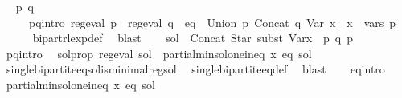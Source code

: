 \begin{isabellebody}
\ \isamarkupfalse%
\ p\ q\isanewline
\ \ \ \ \ p{\isacharunderscore}{\kern0pt}q{\isacharunderscore}{\kern0pt}intro{\isacharcolon}{\kern0pt}\ {\isachardoublequoteopen}reg{\isacharunderscore}{\kern0pt}eval\ p\ {\isasymand}\ reg{\isacharunderscore}{\kern0pt}eval\ q\ {\isasymand}\ eq{\isacharprime}{\kern0pt}\ {\isacharequal}{\kern0pt}\ Union\ p\ {\isacharparenleft}{\kern0pt}Concat\ q\ {\isacharparenleft}{\kern0pt}Var\ x{\isacharparenright}{\kern0pt}{\isacharparenright}{\kern0pt}\ {\isasymand}\ x\ {\isasymnotin}\ vars\ p{\isachardoublequoteclose}\isanewline
\ \ \ \ \isamarkupfalse%
\ bipart{\isacharunderscore}{\kern0pt}rlexp{\isacharunderscore}{\kern0pt}def\ \isamarkupfalse%
\ blast\isanewline
\ \ \isamarkupfalse%
\ {\isacharquery}{\kern0pt}sol\ {\isacharequal}{\kern0pt}\ {\isachardoublequoteopen}Concat\ {\isacharparenleft}{\kern0pt}Star\ {\isacharparenleft}{\kern0pt}subst\ {\isacharparenleft}{\kern0pt}Var{\isacharparenleft}{\kern0pt}x\ {\isacharcolon}{\kern0pt}{\isacharequal}{\kern0pt}\ p{\isacharparenright}{\kern0pt}{\isacharparenright}{\kern0pt}\ q{\isacharparenright}{\kern0pt}{\isacharparenright}{\kern0pt}\ p{\isachardoublequoteclose}\isanewline
\ \ \isamarkupfalse%
\ p{\isacharunderscore}{\kern0pt}q{\isacharunderscore}{\kern0pt}intro\ \isamarkupfalse%
\ sol{\isacharunderscore}{\kern0pt}prop{\isacharcolon}{\kern0pt}\ {\isachardoublequoteopen}reg{\isacharunderscore}{\kern0pt}eval\ {\isacharquery}{\kern0pt}sol\ {\isasymand}\ partial{\isacharunderscore}{\kern0pt}min{\isacharunderscore}{\kern0pt}sol{\isacharunderscore}{\kern0pt}one{\isacharunderscore}{\kern0pt}ineq\ x\ eq{\isacharprime}{\kern0pt}\ {\isacharquery}{\kern0pt}sol{\isachardoublequoteclose}\isanewline
\ \ \ \ \isamarkupfalse%
\ single{\isacharunderscore}{\kern0pt}bipartite{\isacharunderscore}{\kern0pt}eq{\isachardot}{\kern0pt}sol{\isacharunderscore}{\kern0pt}is{\isacharunderscore}{\kern0pt}minimal{\isacharunderscore}{\kern0pt}reg{\isacharunderscore}{\kern0pt}sol\ \isamarkupfalse%
\ single{\isacharunderscore}{\kern0pt}bipartite{\isacharunderscore}{\kern0pt}eq{\isacharunderscore}{\kern0pt}def\ \isamarkupfalse%
\ blast\isanewline
\ \ \isamarkupfalse%
\ eq{\isacharprime}{\kern0pt}{\isacharunderscore}{\kern0pt}intro\ \isamarkupfalse%
\ {\isachardoublequoteopen}partial{\isacharunderscore}{\kern0pt}min{\isacharunderscore}{\kern0pt}sol{\isacharunderscore}{\kern0pt}one{\isacharunderscore}{\kern0pt}ineq\ x\ eq\ {\isacharquery}{\kern0pt}sol{\isachardoublequoteclose}\isanewline

\end{isabellebody}
